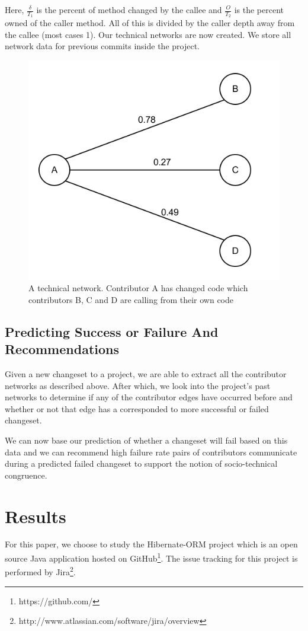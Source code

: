 \documentclass[conference]{IEEEtran}
\begin{document}
Here, $\frac{\delta}{T_{1}}$ is the percent of method changed by the callee and $\frac{O}{T_{2}}$ 
is the percent owned of the caller method. All of this is divided by the caller depth away from 
the callee (most cases 1).  Our technical networks are now created. We store all network data for
previous commits inside the project.

\begin{figure}[tb!]
\centering
\includegraphics[width=0.5\columnwidth]{images/network}
\caption{A technical network. Contributor A has changed code which contributors B, C and D 
are calling from their own code}
\end{figure}

\subsection{Predicting Success or Failure And Recommendations}
Given a new changeset to a project, we are able to extract all the contributor networks as described
above. After which, we look into the project's past networks to determine if any of the contributor edges have
occurred before and whether or not that edge has a  corresponded to more successful or failed changeset. 

We can now base our prediction of whether a changeset will fail based on this data and we can recommend
high failure rate pairs of contributors communicate during a predicted failed changeset to support the notion
of socio-technical congruence.

\section{Results}
For this paper, we choose to study the Hibernate-ORM project which is an open source Java 
application hosted on GitHub\footnote{https://github.com/}. The issue tracking for this 
project is performed by Jira\footnote{http://www.atlassian.com/software/jira/overview}.
\end{document}
